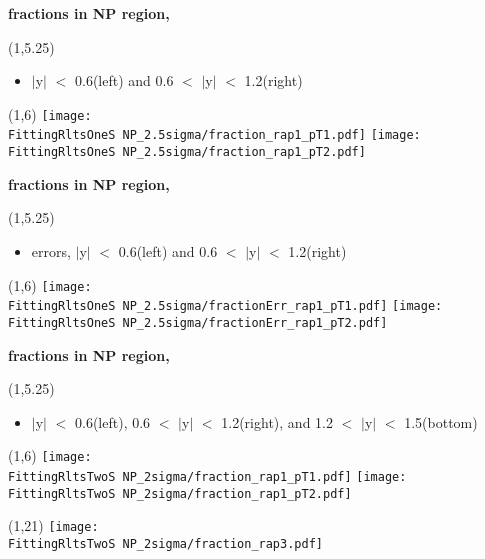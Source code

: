 \documentclass[11pt,slidescentered,red,compress,handout,hyperref={bookmarks=true},mathseriftable]{beamer}
\newcommand{\FittingRltsOneS}{../Psi1S/Fit/parameter/evaluateCtau/}
\newcommand{\FittingRltsTwoS}{../Psi2S/Fit/parameter/evaluateCtau/}
\begin{document}
\begin{frame}[t]{\small \bf fractions in NP region,  }{}
\begin{textblock}{48}(1,5.25)
\begin{itemize}
\scriptsize \item  $|$y$|$ $<$ 0.6(left) and 0.6 $<$ $|$y$|$ $<$ 1.2(right)
\end{itemize}
\end{textblock}
\begin{textblock}{48}(1,6)
\hspace*{10pt} \texttt{[image: \\FittingRltsOneS NP\_2.5sigma/fraction\_rap1\_pT1.pdf]}
\hspace*{10pt} \texttt{[image: \\FittingRltsOneS NP\_2.5sigma/fraction\_rap1\_pT2.pdf]}
\end{textblock}
\end{frame}

\begin{frame}[t]{\small \bf fractions in NP region,  }{}
\begin{textblock}{48}(1,5.25)
\begin{itemize}
\scriptsize \item  errors, $|$y$|$ $<$ 0.6(left) and 0.6 $<$ $|$y$|$ $<$ 1.2(right)
\end{itemize}
\end{textblock}
\begin{textblock}{48}(1,6)
\hspace*{10pt} \texttt{[image: \\FittingRltsOneS NP\_2.5sigma/fractionErr\_rap1\_pT1.pdf]}
\hspace*{10pt} \texttt{[image: \\FittingRltsOneS NP\_2.5sigma/fractionErr\_rap1\_pT2.pdf]}
\end{textblock}
\end{frame}

\begin{frame}[t]{\small \bf fractions in NP region,  }{}
\begin{textblock}{48}(1,5.25)
\begin{itemize}
\scriptsize \item  $|$y$|$ $<$ 0.6(left), 0.6 $<$ $|$y$|$ $<$ 1.2(right), and 1.2 $<$ $|$y$|$ $<$ 1.5(bottom)
\end{itemize}
\end{textblock}
\begin{textblock}{48}(1,6)
\hspace*{10pt} \texttt{[image: \\FittingRltsTwoS NP\_2sigma/fraction\_rap1\_pT1.pdf]}
\hspace*{10pt} \texttt{[image: \\FittingRltsTwoS NP\_2sigma/fraction\_rap1\_pT2.pdf]}
\begin{textblock}{48}(1,21)
\hspace*{10pt} \texttt{[image: \\FittingRltsTwoS NP\_2sigma/fraction\_rap3.pdf]}
\end{textblock}
\end{textblock}
\end{frame}
\end{document}
